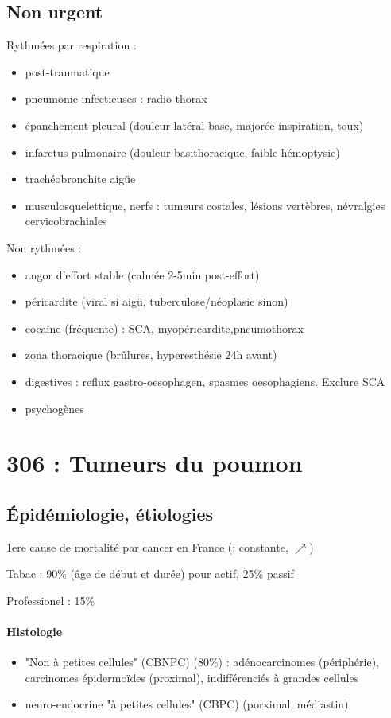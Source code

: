 \documentclass{article}
\begin{document}
\subsection{Non urgent}
Rythmées par respiration :
\begin{itemize}
\item post-traumatique
\item pneumonie infectieuses : radio thorax
\item épanchement pleural (douleur latéral-base, majorée inspiration, toux)
\item infarctus pulmonaire (douleur basithoracique, faible hémoptysie)
\item trachéobronchite aigüe
\item musculosquelettique, nerfs : tumeurs costales, lésions vertèbres,
  névralgies cervicobrachiales
\end{itemize}
Non rythmées :
\begin{itemize}
\item angor d'effort stable (calmée 2-5min post-effort)
\item péricardite (viral si aigü, tuberculose/néoplasie sinon)
\item cocaïne (fréquente) : SCA, myopéricardite,pneumothorax
\item zona thoracique (brûlures, hyperesthésie 24h avant)
\item digestives : reflux gastro-oesophagen, spasmes oesophagiens. Exclure SCA
  \skull
\item psychogènes
\end{itemize}

\section{306 : Tumeurs du poumon}%
\label{sec:306_tumeurs_du_poumon}

\subsection{Épidémiologie, étiologies}
1ere cause de mortalité par cancer en France (\male : constante, \female
$\nearrow$)

Tabac : 90\% (âge de début et durée) pour actif, 25\% passif

Professionel : 15\%

\paragraph{Histologie}
\begin{itemize}
\item "Non à petites cellules" (CBNPC) (80\%) : adénocarcinomes (périphérie),
  carcinomes épidermoïdes (proximal), indifférenciés à grandes cellules
\item neuro-endocrine "à petites cellules" (CBPC) (porximal, médiastin)
\end{itemize}
\end{document}
